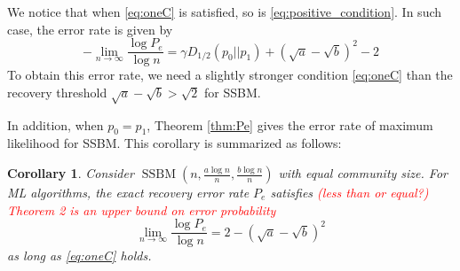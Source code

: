 \documentclass[conference,letterpaper]{IEEEtran}
\newtheorem{theorem}{Theorem}
\newtheorem{corollary}{Corollary}
\DeclareMathOperator{\SSBM}{SSBM}
\begin{document}
We notice that when \eqref{eq:oneC} is satisfied,
so is \eqref{eq:positive_condition}. In such case, the error
rate is given by
$$
-\lim_{n\to \infty} \frac{\log P_e}{\log n}
= \gamma D_{1/2}(p_0||p_1) + (\sqrt{a} - \sqrt{b})^2-2
$$
To obtain this error rate,
we need a slightly stronger condition \eqref{eq:oneC}
than the recovery threshold $\sqrt{a}-\sqrt{b} > \sqrt{2}$
for SSBM.

In addition, when $p_0=p_1$,
Theorem \ref{thm:Pe} gives the error rate of maximum likelihood for SSBM. This corollary is
summarized as follows:
\begin{corollary}\label{cor:sbm}
Consider $\SSBM(n,\frac{a\log n}{n}, \frac{b \log n}{n})$ with equal community size.
For ML algorithms, the exact recovery error rate $P_e$ satisfies \textcolor{red}{(less than or equal?) Theorem 2 is an upper bound on error probability}
\begin{equation}\label{eq:cor}
\lim_{n\to \infty} \frac{\log P_e}{\log n} =2-(\sqrt{a} - \sqrt{b})^2
\end{equation}
as long as \eqref{eq:oneC} holds.
\end{corollary}
\end{document}
